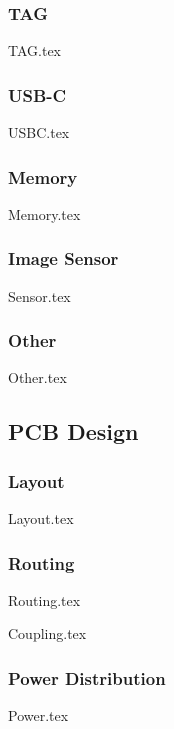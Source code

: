     \subsubsection{TAG}
        {TAG.tex}

    \subsubsection{USB-C}
        {USBC.tex}

    \subsubsection{Memory}
        {Memory.tex}

    \subsubsection{Image Sensor}\label{sec:v0.1-sensor}
        {Sensor.tex}

    \subsubsection{Other}\label{sec:v0.1-sch-other}
        {Other.tex}

\subsection{PCB Design}

    \subsubsection{Layout}
        {Layout.tex}

    \subsubsection{Routing}
        {Routing.tex}

        {Coupling.tex}\label{sec:v0.1-coupling}

    \subsubsection{Power Distribution}
        {Power.tex}

